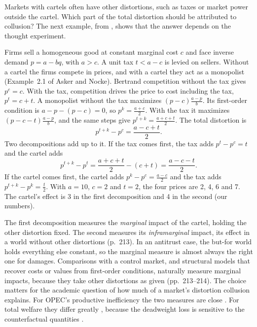 Markets with cartels often have other distortions, such as taxes or market power outside the cartel. Which part of
the total distortion should be attributed to collusion? The next example, from \citet[pp.~212--213]{AskerNocke2021},
shows that the answer depends on the thought experiment.

\begin{example}\label{ex:13-tax-cartel}
Firms sell a homogeneous good at constant marginal cost $c$ and face inverse demand $p = a - bq$, with $a > c$. A
unit tax $t < a - c$ is levied on sellers. Without a cartel the firms compete in prices, and with a cartel they
act as a monopolist (Example~2.1 of Asker and Nocke). Bertrand competition without the tax gives $p^{c} = c$. With
the tax, competition drives the price to cost including the tax, $p^{t} = c + t$. A monopolist without the tax
maximizes $(p - c)\frac{a - p}{b}$. Its first-order condition is $a - p - (p - c) = 0$, so
$p^{k} = \frac{a + c}{2}$. With the tax it maximizes $(p - c - t)\frac{a - p}{b}$, and the same steps give
$p^{t+k} = \frac{a + c + t}{2}$. The total distortion is
\begin{equation*}
  p^{t+k} - p^{c} = \frac{a - c + t}{2} .
\end{equation*}
Two decompositions add up to it. If the tax comes first, the tax adds $p^{t} - p^{c} = t$ and the cartel adds
\begin{equation*}
  p^{t+k} - p^{t} = \frac{a + c + t}{2} - (c + t) = \frac{a - c - t}{2} .
\end{equation*}
If the cartel comes first, the cartel adds $p^{k} - p^{c} = \frac{a - c}{2}$ and the tax adds
$p^{t+k} - p^{k} = \frac{t}{2}$. With $a = 10$, $c = 2$ and $t = 2$, the four prices are 2, 4, 6 and 7. The cartel's
effect is 3 in the first decomposition and 4 in the second (our numbers).
\end{example}

The first decomposition measures the \emph{marginal} impact of the cartel, holding the other distortion fixed. The
second measures its \emph{inframarginal} impact, its effect in a world without other distortions (p.~213). In an
antitrust case, the but-for world holds everything else constant, so the marginal measure is almost always the
right one for damages. Comparisons with a control market, and structural models that recover costs or values from
first-order conditions, naturally measure marginal impacts, because they take other distortions as given
(pp.~213--214). The choice matters for the academic question of how much of a market's distortion collusion
explains. For OPEC's productive inefficiency the two measures are close
\citep{AskerCollardWexlerDeLoecker2019}. For total welfare they differ greatly
\citep{AskerCollardWexlerDeLoecker2021}, because the deadweight loss is sensitive to the counterfactual quantities
\citep[p.~214]{AskerNocke2021}.

